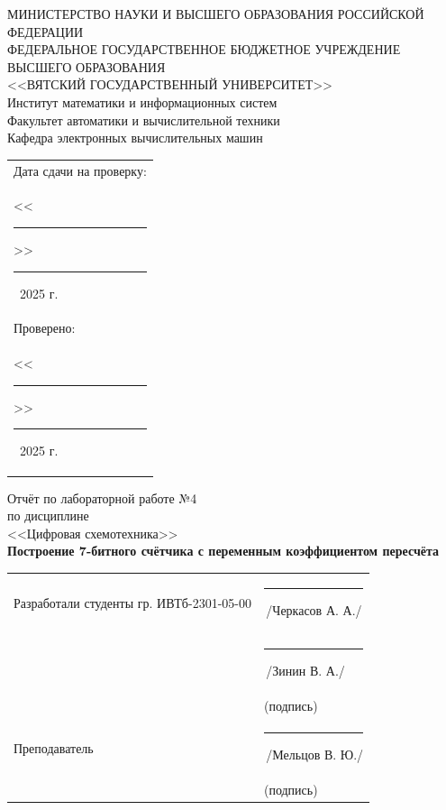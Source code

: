 \documentclass[oneside,a4paper,14pt]{extarticle}
\begin{document}
\newpage
\thispagestyle{empty}
\begin{center}
  МИНИСТЕРСТВО НАУКИ И ВЫСШЕГО ОБРАЗОВАНИЯ РОССИЙСКОЙ ФЕДЕРАЦИИ\\
  ФЕДЕРАЛЬНОЕ ГОСУДАРСТВЕННОЕ БЮДЖЕТНОЕ УЧРЕЖДЕНИЕ ВЫСШЕГО ОБРАЗОВАНИЯ\\
  <<ВЯТСКИЙ ГОСУДАРСТВЕННЫЙ УНИВЕРСИТЕТ>>\\
  Институт математики и информационных систем\\
  Факультет автоматики и вычислительной техники\\
  Кафедра электронных вычислительных машин
\end{center}
\vspace{10mm}

\hfill
\begin{tabular}{l}
  \footnotesize Дата сдачи на проверку:                                          \\
  \footnotesize <<\rule[-1mm]{5mm}{0.10mm}\/>>\rule[-1mm]{20mm}{0.10mm}\ 2025 г. \\
  \footnotesize Проверено:                                                       \\
  \footnotesize <<\rule[-1mm]{5mm}{0.10mm}\/>>\rule[-1mm]{20mm}{0.10mm}\ 2025 г. \\
\end{tabular}
\vfill

\begin{center}
  Отчёт по лабораторной работе №4\\
  по дисциплине\\
  <<Цифровая схемотехника>>\\
  \textbf{Построение 7-битного счётчика с переменным коэффициентом пересчёта}\\
\end{center}
\vspace{25mm}
\noindent
\begin{tabular}{ll}
  Разработали студенты гр. ИВТб-2301-05-00 & \hspace{5mm}\rule[-1mm]{30mm}{0.10mm}\,/Черкасов А. А./ \\
                                           & \hspace{5mm}\rule[-1mm]{30mm}{0.10mm}\,/Зинин В. А./    \\
                                           & \hspace{12.5mm}\footnotesize(подпись)                   \\
  Преподаватель                           & \hspace{5mm}\rule[-1mm]{30mm}{0.10mm}\,/Мельцов В. Ю./  \\
                                           & \hspace{12.5mm}\footnotesize(подпись)                   \\
\end{tabular}
\end{document}
